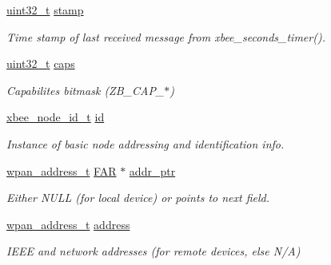 \begin{DoxyCompactItemize}
\hyperlink{group__hal__dos_ga09a1e304d66d35dd47daffee9731edaa}{uint32\+\_\+t} \hyperlink{structsxa__node__t_ac543485164457c0eefd43dcee04c82c6}{stamp}
\begin{DoxyCompactList}\small\item\em Time stamp of last received message from xbee\+\_\+seconds\+\_\+timer(). \end{DoxyCompactList}\item 
\mbox{\label{structsxa__node__t_a6d8abccf90f28f0ea0a3423eaffacc7e}} 
\hyperlink{group__hal__dos_ga09a1e304d66d35dd47daffee9731edaa}{uint32\+\_\+t} \hyperlink{structsxa__node__t_a6d8abccf90f28f0ea0a3423eaffacc7e}{caps}
\begin{DoxyCompactList}\small\item\em Capabilites bitmask (Z\+B\+\_\+\+C\+A\+P\+\_\+$\ast$) \end{DoxyCompactList}\item 
\mbox{\label{structsxa__node__t_a65028dacab709b3d58f37d40d9c1b572}} 
\hyperlink{structxbee__node__id__t}{xbee\+\_\+node\+\_\+id\+\_\+t} \hyperlink{structsxa__node__t_a65028dacab709b3d58f37d40d9c1b572}{id}
\begin{DoxyCompactList}\small\item\em Instance of basic node addressing and identification info. \end{DoxyCompactList}\item 
\hyperlink{structwpan__address__t}{wpan\+\_\+address\+\_\+t} \hyperlink{group__hal_gaef060b3456fdcc093a7210a762d5f2ed}{F\+AR} $\ast$ \hyperlink{structsxa__node__t_ae22454fb2324ac2f3c9ddc07fe24ae35}{addr\+\_\+ptr}
\begin{DoxyCompactList}\small\item\em Either N\+U\+LL (for local device) or points to next field. \end{DoxyCompactList}\item 
\mbox{\label{structsxa__node__t_a66a58a737aee9733019399e2eceabf4a}} 
\hyperlink{structwpan__address__t}{wpan\+\_\+address\+\_\+t} \hyperlink{structsxa__node__t_a66a58a737aee9733019399e2eceabf4a}{address}
\begin{DoxyCompactList}\small\item\em I\+E\+EE and network addresses (for remote devices, else N/A) \end{DoxyCompactList}\item 

\end{DoxyCompactItemize}
